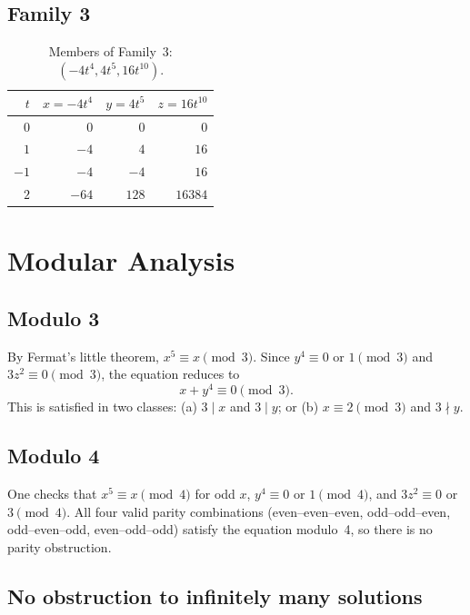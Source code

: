 \documentclass[12pt,a4paper]{article}
\theoremstyle{definition}
\begin{document}
\subsection{Family 3}

\begin{table}[h]
\centering
\caption{Members of Family~3: $(-4t^4, 4t^5, 16t^{10})$.}
\label{tab:family3}
\renewcommand{\arraystretch}{1.2}
\begin{tabular}{rrrr}
\toprule
$t$ & $x = -4t^4$ & $y = 4t^5$ & $z = 16t^{10}$ \\
\midrule
$0$  & $0$    & $0$    & $0$      \\
$1$  & $-4$   & $4$    & $16$     \\
$-1$ & $-4$   & $-4$   & $16$     \\
$2$  & $-64$  & $128$  & $16384$  \\
\bottomrule
\end{tabular}
\end{table}

\section{Modular Analysis}\label{sec:modular}

\subsection{Modulo 3}

By Fermat's little theorem, $x^5 \equiv x \pmod{3}$.  Since $y^4 \equiv 0$ or $1
\pmod{3}$ and $3z^2 \equiv 0 \pmod{3}$, the equation reduces to
\[
  x + y^4 \equiv 0 \pmod{3}.
\]
This is satisfied in two classes: (a) $3 \mid x$ and $3 \mid y$; or (b)
$x \equiv 2 \pmod{3}$ and $3 \nmid y$.

\subsection{Modulo 4}

One checks that $x^5 \equiv x \pmod{4}$ for odd $x$, $y^4 \equiv 0$ or $1 \pmod{4}$,
and $3z^2 \equiv 0$ or $3 \pmod{4}$.  All four valid parity combinations
(even--even--even, odd--odd--even, odd--even--odd, even--odd--odd) satisfy the
equation modulo~4, so there is no parity obstruction.

\subsection{No obstruction to infinitely many solutions}
\end{document}
